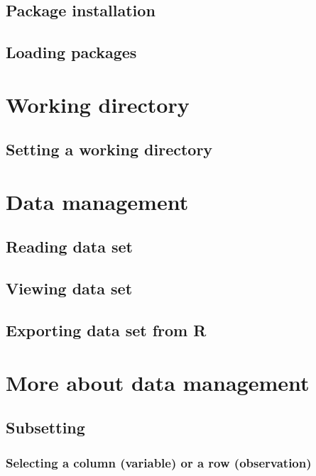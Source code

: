 \documentclass[]{book}
\theoremstyle{definition}
\theoremstyle{definition}
\theoremstyle{definition}
\theoremstyle{remark}
\begin{document}
\subsection{Package installation}\label{package-installation}

\subsection{Loading packages}\label{loading-packages}

\section{Working directory}\label{working-directory}

\subsection{Setting a working
directory}\label{setting-a-working-directory}

\section{Data management}\label{data-management}

\subsection{Reading data set}\label{reading-data-set}

\subsection{Viewing data set}\label{viewing-data-set}

\subsection{Exporting data set from R}\label{exporting-data-set-from-r}

\section{More about data management}\label{more-about-data-management}

\subsection{Subsetting}\label{subsetting}

\subsubsection{Selecting a column (variable) or a row
(observation)}\label{selecting-a-column-variable-or-a-row-observation}
\end{document}
